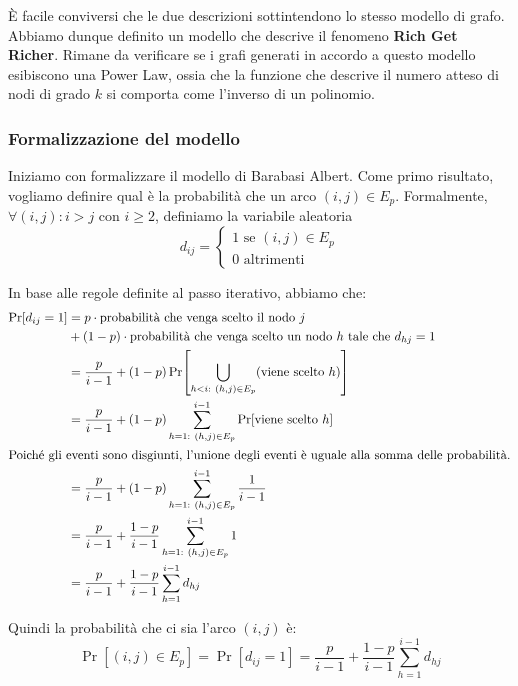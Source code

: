  È facile conviversi che le due descrizioni sottintendono lo stesso modello di grafo. Abbiamo dunque definito un modello che descrive il fenomeno \textbf{Rich Get Richer}. Rimane da verificare se i grafi generati in accordo a questo modello esibiscono una Power Law, ossia che la funzione che descrive il numero atteso di nodi di grado $k$ si comporta come l'inverso di un polinomio.

\vspace{0.5cm}


 \subsubsection{Formalizzazione del modello}

Iniziamo con formalizzare il modello di Barabasi Albert. Come primo risultato, vogliamo definire qual è la probabilità che un arco $(i,j) \in E_{p}$. Formalmente, $\forall (i,j): i > j$ con $i \geq 2$, definiamo la variabile aleatoria
\[
    d_{ij} = 
\begin{cases}
    1 \text{ se }(i,j) \in E_p \\
    0 \text{ altrimenti}
\end{cases}
\]

 In base alle regole definite al passo iterativo, abbiamo che:
\begin{align*}
    \Pr[d_{ij} = 1] &= p \cdot \text{probabilità che venga scelto il nodo } j  \\ 
    &+ (1 - p) \cdot \text{probabilità che venga scelto un nodo } h \text{ tale che } d_{hj} = 1 \\
    &= \frac{p}{i - 1} + (1 - p) \Pr[\bigcup_{h < i:\ (h, j) \in E_p} (\text{viene scelto } h)] \\
    &= \frac{p}{i - 1} + (1 - p) \sum_{h = 1:\ (h, j) \in E_p}^{i-1} \Pr[\text{viene scelto } h] \\
    \intertext{Poiché gli eventi sono disgiunti, l'unione degli eventi è uguale alla somma delle probabilità.}
    &= \frac{p}{i - 1} + (1 - p) \sum_{h = 1:\ (h, j) \in E_p}^{i-1} \frac{1}{i - 1} \\
    &= \frac{p}{i - 1} + \frac{1 - p}{i - 1} \sum_{h = 1:\ (h, j) \in E_p}^{i-1} 1 \\
    &= \frac{p}{i - 1} + \frac{1 - p}{i - 1} \sum_{h = 1}^{i-1} d_{hj}
\end{align*}

Quindi la probabilità che ci sia l'arco $(i,j)$ è:
\[
\Pr[(i,j) \in E_p] = \Pr[d_{ij} = 1] = \frac{p}{i - 1} + \frac{1 - p}{i - 1} \sum_{h = 1}^{i-1} d_{hj}
\]

